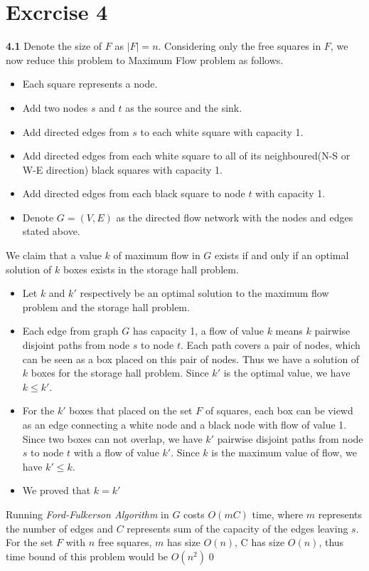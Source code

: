 \documentclass[10pt]{article}
\begin{document}
\section*{Excrcise 4}
\textbf{4.1} Denote the size of $F$ as $|F| = n$. Considering only the free squares in $F$, we now reduce this problem to Maximum Flow problem as follows.
\begin{itemize}
	\item Each square represents a node.
	\item Add two nodes $s$ and $t$ as the source and the sink.
	\item Add directed edges from $s$ to each white square with capacity 1.
	\item Add directed edges from each white square to all of its neighboured(N-S or W-E direction) black squares with capacity 1.
	\item Add directed edges from each black square to node $t$ with capacity 1.
	\item Denote $G=(V, E)$ as the directed flow network with the nodes and edges stated above. 
\end{itemize}
We claim that a value $k$ of maximum flow in $G$ exists if and only if an optimal solution of $k$ boxes exists in the storage hall problem.
\begin{itemize}
	\item Let $k$ and $k'$ respectively be an optimal solution to the maximum flow problem and the storage hall problem.
	\item Each edge from graph $G$ has capacity 1, a flow of value $k$ means $k$ pairwise disjoint paths from node $s$ to node $t$. Each path covers a pair of nodes, which can be seen as a box placed on this pair of nodes. Thus we have a solution of $k$ boxes for the storage hall problem. Since $k'$ is the optimal value, we have $k \leq k'$.
	\item For the $k'$ boxes that placed on the set $F$ of squares, each box can be viewd as an edge connecting a white node and a black node with flow of value 1. Since two boxes can not overlap, we have $k'$ pairwise disjoint paths from node $s$ to node $t$ with a flow of value $k'$. Since $k$ is the maximum value of flow, we have $k' \leq k$.
	\item We proved that $k = k'$
\end{itemize}
Running \emph{Ford-Fulkerson Algorithm} in $G$ costs $O(mC)$ time, where $m$ represents the number of edges and $C$ represents sum of the capacity of the edges leaving $s$. For the set $F$ with $n$ free squares, $m$ has size $O(n)$, C has size $O(n)$, thus time bound of this problem would be $O(n^2)$\qed \\
\end{document}
